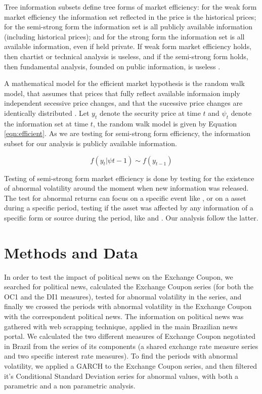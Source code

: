 \documentclass[a4paper]{article}
\begin{document}
Tree information subsets define tree forms of market efficiency: for the weak form market efficiency the information set reflected in the price is the historical prices; for the semi-strong form the information set is all publicly available information (including historical prices); and for the strong form the information set is all available information, even if held private. If weak form market efficiency holds, then chartist or technical analysis is useless, and if the semi-strong form holds, then fundamental analysis, founded on public information, is useless \citet{oprean2012}.

A mathematical model for the efficient market hypothesis is the random walk model, that assumes that prices that fully reflect available informaion imply independent secessive price changes, and that the sucessive price changes are identically distributed \citet{fama1970} . Let $y_t$ denote the security price at time $t$ and $\psi_t$ denote the information set at time $t$, the random walk model is given by Equation \ref{eqn:efficient}. As we are testing for semi-strong form efficiency, the information subset for our analysis is publicly available information.

\begin{equation}
\label{eqn:efficient}
f ( y_t | \psi{t-1} ) \sim f(y_{t-1})
\end{equation}

Testing of semi-strong form market efficiency is done by testing for the existence of abnormal volatility around the moment when new information was released. The test for abnormal returns can focus on a specific event like \citet{gabrielribeiro2013}, or on a asset during a specific period, testing if the asset was affected by any information of a specific form or source during the period, like \citet{larsenthorsrud2017} and \citet{caporaleetal2015}. Our analysis follow the latter.


\section{Methods and Data}


In order to test the impact of political news on the Exchange Coupon, we searched for political news, calculated the Exchange Coupon series (for both the OC1 and the DI1 measures), tested for abnormal volatility in the series, and finally we crossed the periods with abnormal volatility in the Exchange Coupon with the correspondent political news. The information on political news was gathered with web scrapping technique, applied in the main Brazilian news portal. We calculated the two different measures of Exchange Coupon negotiated in Brazil from the series of its components (a shared exchange rate measure series and two specific interest rate measures). To find the periods with abnormal volatility, we applied a GARCH to the Exchange Coupon series, and then filtered it's Conditional Standard Deviation series for abnormal values, with both a parametric and a non parametric analysis.
\end{document}
